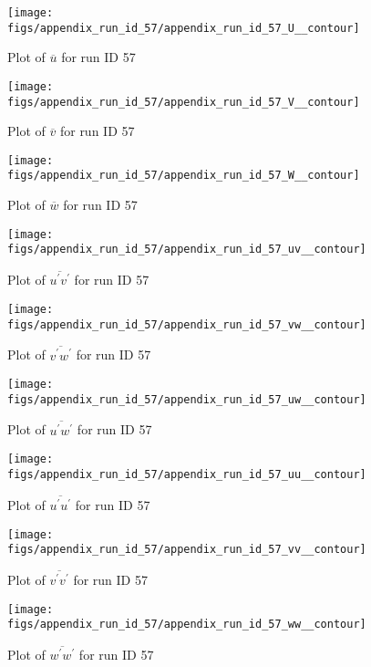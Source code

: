 \begin{figure}[H]
\centering
\texttt{[image: figs/appendix\_run\_id\_57/appendix\_run\_id\_57\_U\_\_contour]}
\caption{Plot of $\overline{u}$ for run ID 57}
\label{fig:appendix_run_id_57_U__contour}
\end{figure}


\begin{figure}[H]
\centering
\texttt{[image: figs/appendix\_run\_id\_57/appendix\_run\_id\_57\_V\_\_contour]}
\caption{Plot of $\overline{v}$ for run ID 57}
\label{fig:appendix_run_id_57_V__contour}
\end{figure}


\begin{figure}[H]
\centering
\texttt{[image: figs/appendix\_run\_id\_57/appendix\_run\_id\_57\_W\_\_contour]}
\caption{Plot of $\overline{w}$ for run ID 57}
\label{fig:appendix_run_id_57_W__contour}
\end{figure}


\begin{figure}[H]
\centering
\texttt{[image: figs/appendix\_run\_id\_57/appendix\_run\_id\_57\_uv\_\_contour]}
\caption{Plot of $\overline{u^\prime v^\prime}$ for run ID 57}
\label{fig:appendix_run_id_57_uv__contour}
\end{figure}


\begin{figure}[H]
\centering
\texttt{[image: figs/appendix\_run\_id\_57/appendix\_run\_id\_57\_vw\_\_contour]}
\caption{Plot of $\overline{v^\prime w^\prime}$ for run ID 57}
\label{fig:appendix_run_id_57_vw__contour}
\end{figure}


\begin{figure}[H]
\centering
\texttt{[image: figs/appendix\_run\_id\_57/appendix\_run\_id\_57\_uw\_\_contour]}
\caption{Plot of $\overline{u^\prime w^\prime}$ for run ID 57}
\label{fig:appendix_run_id_57_uw__contour}
\end{figure}


\begin{figure}[H]
\centering
\texttt{[image: figs/appendix\_run\_id\_57/appendix\_run\_id\_57\_uu\_\_contour]}
\caption{Plot of $\overline{u^\prime u^\prime}$ for run ID 57}
\label{fig:appendix_run_id_57_uu__contour}
\end{figure}


\begin{figure}[H]
\centering
\texttt{[image: figs/appendix\_run\_id\_57/appendix\_run\_id\_57\_vv\_\_contour]}
\caption{Plot of $\overline{v^\prime v^\prime}$ for run ID 57}
\label{fig:appendix_run_id_57_vv__contour}
\end{figure}


\begin{figure}[H]
\centering
\texttt{[image: figs/appendix\_run\_id\_57/appendix\_run\_id\_57\_ww\_\_contour]}
\caption{Plot of $\overline{w^\prime w^\prime}$ for run ID 57}
\label{fig:appendix_run_id_57_ww__contour}
\end{figure}


